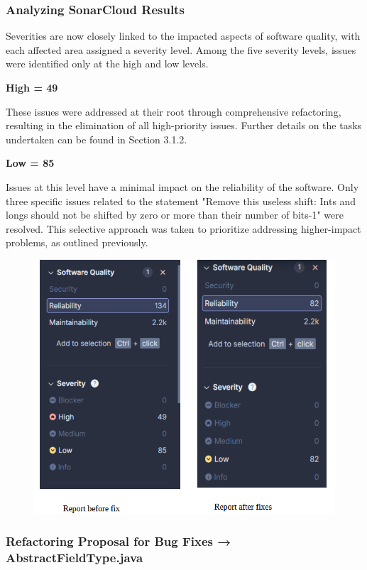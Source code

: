\documentclass[sigconf]{acmart}
\begin{document}
\subsubsection{Analyzing SonarCloud Results}

Severities are now closely linked to the impacted aspects of software quality, with each affected area assigned a severity level. Among the five severity levels, issues were identified only at the high and low levels.

\textbf{High = 49}

These issues were addressed at their root through comprehensive refactoring, resulting in the elimination of all high-priority issues. Further details on the tasks undertaken can be found in Section 3.1.2.

\textbf{Low = 85}

Issues at this level have a minimal impact on the reliability of the software. Only three specific issues related to the statement "Remove this useless shift: Ints and longs should not be shifted by zero or more than their number of bits-1" were resolved. This selective approach was taken to prioritize addressing higher-impact problems, as outlined previously.

\begin{figure}[h!]
    \centering
    \includegraphics[width=1\linewidth]{reportSonarCloud.png}
    \caption{}
    \label{fig:enter-label}
\end{figure}

\subsubsection{Refactoring Proposal for Bug Fixes → AbstractFieldType.java}
\end{document}
